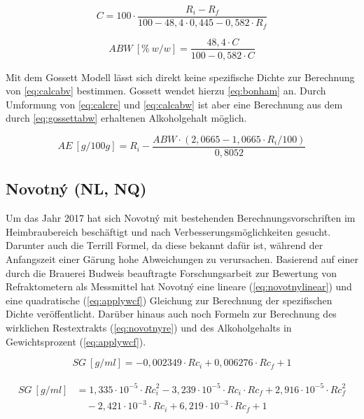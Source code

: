 \documentclass[a4paper,parskip=half]{scrartcl}
\newcommand{\bxi}{\mathit{R}_i}
\newcommand{\bxic}{\mathit{Rc}_i}
\newcommand{\bxf}{\mathit{R}_f}
\newcommand{\bxfc}{\mathit{Rc}_f}
\newcommand{\sg}{\mathit{SG}}
\newcommand{\abw}{\mathit{ABW}}
\newcommand{\aex}{\mathit{AE}}
\begin{document}
\begin{equation}
C = 100 \cdot \frac{\bxi - \bxf}{100 - 48,4 \cdot 0,445 - 0,582 \cdot \bxf}
\label{eq:gossett} 
\end{equation}

\begin{equation}
\abw\:[\%\:w/w] = \frac{48,4 \cdot C}{100 - 0,582 \cdot C}
\label{eq:gossettabw} 
\end{equation}

Mit dem Gossett Modell lässt sich direkt keine spezifische Dichte
zur Berechnung von \autoref{eq:calcabv} bestimmen. Gossett wendet
hierzu \autoref{eq:bonham} an. Durch Umformung von
\autoref{eq:calcre} und \autoref{eq:calcabw} ist aber eine Berechnung
aus dem durch \autoref{eq:gossettabw} erhaltenen Alkoholgehalt möglich.

\begin{equation}
\aex\:[g/100g] = \bxi - \frac{\abw \cdot (2,0665 - 1,0665 \cdot \bxi / 100)}{0,8052}
\label{eq:gossettcor}
\end{equation}

\subsection*{Novotný (NL, NQ)}

Um das Jahr 2017 hat sich Novotný mit bestehenden Berechnungsvorschriften
im Heimbraubereich beschäftigt und nach Verbesserungsmöglichkeiten
gesucht. Darunter auch die Terrill Formel, da diese bekannt dafür
ist, während der Anfangszeit einer Gärung hohe Abweichungen
zu verursachen. Basierend auf einer durch die Brauerei Budweis beauftragte Forschungsarbeit zur Bewertung von Refraktometern
\parencite{Savel2009} als Messmittel
hat Novotný eine lineare (\autoref{eq:novotnylinear}) und eine quadratische
(\autoref{eq:applywcf}) Gleichung zur Berechnung der spezifischen
Dichte veröffentlicht. Darüber hinaus auch noch Formeln zur
Berechnung des wirklichen Restextrakts (\autoref{eq:novotnyre}) und
des Alkoholgehalts in Gewichtsprozent (\autoref{eq:applywcf}). \parencite{Novotny2017a,Novotny2017}

\begin{equation} 
\sg\:[g/ml] = -0,002349 \cdot \bxic + 0,006276 \cdot \bxfc + 1
\label{eq:novotnylinear} 
\end{equation}

\begin{align}
\begin{split}
\sg\:[g/ml] &= 1,335 \cdot 10^{-5} \cdot \bxic^2 - 3,239 \cdot 10^{-5} \cdot \bxic \cdot \bxfc + 2,916 \cdot 10^{-5} \cdot \bxfc^2 \\
& \quad - 2,421 \cdot 10^{-3} \cdot \bxic + 6,219 \cdot 10^{-3} \cdot \bxfc + 1
\end{split} \label{eq:novotnyquadratic} 
\end{align}
\end{document}
